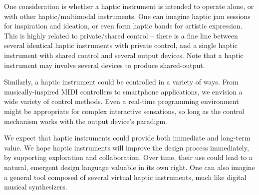 	One consideration is whether a haptic instrument is intended to operate alone, or with other haptic/multimodal instruments.
	One can imagine haptic jam sessions for inspiration and ideation, or even form haptic bands for artistic expression.
	This is highly related to private/shared control -- there is a fine line between several identical haptic instruments with private control, and a single haptic instrument with shared control and several output devices. Note that a haptic instrument may involve several devices to produce shared-output.

	 Similarly, a haptic instrument could be controlled in a variety of ways.
	From musically-inspired MIDI controllers to smartphone applications, we envision a wide variety of control methods.
	Even a real-time programming environment might be appropriate for complex interactive sensations,
	so long as the control mechanism works with the output device's paradigm.


We expect that haptic instruments could provide both immediate and long-term value.
We hope haptic instruments will improve the design process immediately, by supporting exploration and collaboration.
Over time, their use could lead to a natural, emergent design language valuable in its own right.
One can also imagine a general tool composed of several virtual haptic instruments, much like digital musical synthesizers.

